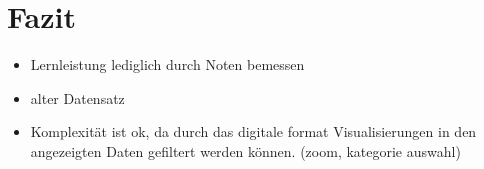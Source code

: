 \chapter[Fazit]{Fazit}


\begin{itemize}
    \item Lernleistung lediglich durch Noten bemessen
    \item alter Datensatz
    \item Komplexität ist ok, da durch das digitale format Visualisierungen in den angezeigten Daten gefiltert werden können. (zoom, kategorie auswahl)
\end{itemize}